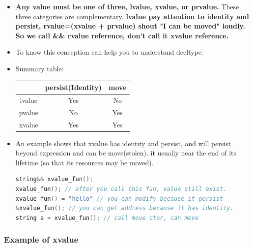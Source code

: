 \documentclass[a4paper,12pt,twoside]{book}
\begin{document}
\begin{itemize}
	\item \textbf{Any value must be one of three, lvalue, xvalue, or prvalue.} These three categories are complementary.  \textbf{lvalue pay attention to  identity and persist, rvalue=(xvalue + prvalue) shout "I can be moved" loudly.  So we call \&\& rvalue reference, don't call it xvalue reference. }
	
	\item To know this conception can help you to understand decltype. 
	
	\item Summary table: \newline
	\begin{tabular}{|c|c|c|}
		\hline
		& persist(Identity) & move \\
		\hline
		lvalue & Yes & No \\
		\hline
		pvalue & No & Yes \\
		\hline
		xvalue & Yes & Yes \\
		\hline
	\end{tabular}

\item An example shows that xvalue has identity and persist, and will persist beyond expression and can be move(stolen). it usually near the end of its lifetime (so that its resources may be moved).
\begin{lstlisting}[frame=single, language=c++, mathescape=true]
string&& xvalue_fun();
xvalue_fun(); // after you call this fun, value still exist.
xvalue_fun() = "hello" // you can modify because it persist
&xvalue_fun(); // you can get address because it has identity.
string a = xvalue_fun(); // call move ctor, can move
\end{lstlisting}

\end{itemize}

\subsubsection{Example of xvalue}
\end{document}
